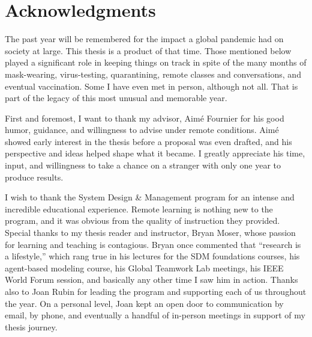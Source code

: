 \cleardoublepage
\setcounter{savepage}{\thepage}
\begin{abstractpage}

\end{abstractpage}

% 

\cleardoublepage

\section*{Acknowledgments}

The past year will be remembered for the impact a global pandemic had on society at large. This thesis is a product of that time. Those mentioned below played a significant role in keeping things on track in spite of the many months of mask-wearing, virus-testing, quarantining, remote classes and conversations, and eventual vaccination. Some I have even met in person, although not all. That is part of the legacy of this most unusual and memorable year.

First and foremost, I want to thank my advisor, Aim\'e Fournier for his good humor, guidance, and willingness to advise under remote conditions. Aim\'e showed early interest in the thesis before a proposal was even drafted, and his perspective and ideas helped shape what it became. I greatly appreciate his time, input, and willingness to take a chance on a stranger with only one year to produce results.

I wish to thank the System Design \& Management program for an intense and incredible educational experience. Remote learning is nothing new to the program, and it was obvious from the quality of instruction they provided. Special thanks to my thesis reader and instructor, Bryan Moser, whose passion for learning and teaching is contagious. Bryan once commented that ``research is a lifestyle,” which rang true in his lectures for the SDM foundations courses, his agent-based modeling course, his Global Teamwork Lab meetings, his IEEE World Forum session, and basically any other time I saw him in action. Thanks also to Joan Rubin for leading the program and supporting each of us throughout the year. On a personal level, Joan kept an open door to communication by email, by phone, and eventually a handful of in-person meetings in support of my thesis journey.

